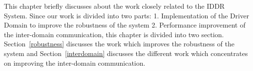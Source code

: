 
This chapter briefly discusses about the work closely related to the IDDR System. Since our work is divided into two parts: 1. Implementation of the Driver Domain to improve the robustness of the system 2. Performance improvement of the inter-domain communication, this chapter is divided into two section. Section~\ref{robustness} discusses the work which improves the robustness of the system and Section~\ref{interdomain} discusses the different work which concentrates on improving the inter-domain communication.






